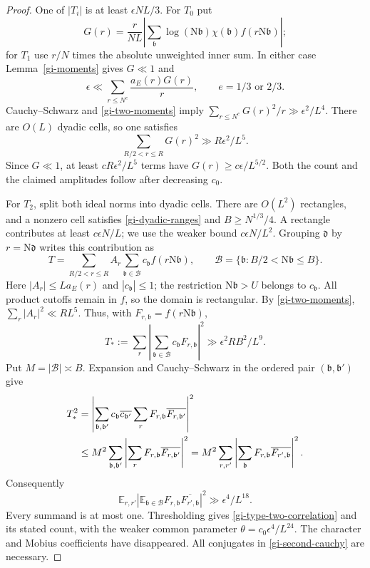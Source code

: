 \documentclass[11pt]{article}
\theoremstyle{definition}
\theoremstyle{remark}
\begin{document}
\begin{proof}
One of $|T_i|$ is at least $\epsilon NL/3$.  For $T_0$ put
\[
 G(r)=\frac{r}{NL}\left|\sum_{\mathfrak b}\log(\mathrm N\mathfrak b)
                   \chi(\mathfrak b)f(r\mathrm N\mathfrak b)\right|;
\]
for $T_1$ use $r/N$ times the absolute unweighted inner sum.  In either
case Lemma~\ref{gi-moments} gives $G\ll1$ and
\[
 \epsilon\ll\sum_{r\leq N^e}\frac{a_E(r)G(r)}r,
 \qquad e=1/3\text{ or }2/3.
\]
Cauchy--Schwarz and \eqref{gi-two-moments} imply
$\sum_{r\leq N^e}G(r)^2/r\gg\epsilon^2/L^4$.
There are $O(L)$ dyadic cells, so one satisfies
\[
 \sum_{R/2<r\leq R}G(r)^2\gg R\epsilon^2/L^5.
\]
Since $G\ll1$, at least $cR\epsilon^2/L^5$ terms have
$G(r)\geq c\epsilon/L^{5/2}$.  Both the count and the claimed amplitudes
follow after decreasing $c_0$.

For $T_2$, split both ideal norms into dyadic cells.  There are $O(L^2)$
rectangles, and a nonzero cell satisfies \eqref{gi-dyadic-ranges} and
$B\geq N^{1/3}/4$.  A rectangle contributes at least $c\epsilon N/L$;
we use the weaker bound $c\epsilon N/L^2$.  Grouping $\mathfrak d$ by
$r=\mathrm N\mathfrak d$ writes this contribution as
\[
 T=\sum_{R/2<r\leq R}A_r\sum_{\mathfrak b\in\mathcal B}c_{\mathfrak b}
                   f(r\mathrm N\mathfrak b),\qquad
 \mathcal B=\{\mathfrak b:B/2<\mathrm N\mathfrak b\leq B\}.
\]
Here $|A_r|\leq L a_E(r)$ and $|c_{\mathfrak b}|\leq1$; the restriction
$\mathrm N\mathfrak b>U$ belongs to $c_{\mathfrak b}$.  All product
cutoffs remain in $f$, so the domain is rectangular.  By
\eqref{gi-two-moments}, $\sum_r|A_r|^2\ll RL^5$.  Thus, with
$F_{r,\mathfrak b}=f(r\mathrm N\mathfrak b)$,
\begin{equation}\label{gi-first-cauchy}
 T_*:=\sum_r\left|\sum_{\mathfrak b\in\mathcal B}
                          c_{\mathfrak b}F_{r,\mathfrak b}\right|^2
          \gg \epsilon^2 RB^2/L^9.
\end{equation}
Put $M=|\mathcal B|\asymp B$.  Expansion and Cauchy--Schwarz in the
ordered pair $(\mathfrak b,\mathfrak b')$ give
\begin{align}
 T_*^2
 &=\left|\sum_{\mathfrak b,\mathfrak b'}
 c_{\mathfrak b}\overline{c_{\mathfrak b'}}
 \sum_r F_{r,\mathfrak b}\overline{F_{r,\mathfrak b'}}\right|^2\notag\\
 &\leq M^2\sum_{\mathfrak b,\mathfrak b'}
       \left|\sum_rF_{r,\mathfrak b}\overline{F_{r,\mathfrak b'}}\right|^2
 =M^2\sum_{r,r'}\left|\sum_{\mathfrak b}
                  F_{r,\mathfrak b}\overline{F_{r',\mathfrak b}}\right|^2.
 \label{gi-second-cauchy}
\end{align}
Consequently
\[
 \mathbb E_{r,r'}\left|\mathbb E_{\mathfrak b\in\mathcal B}
              F_{r,\mathfrak b}\overline{F_{r',\mathfrak b}}\right|^2
       \gg\epsilon^4/L^{18}.
\]
Every summand is at most one.  Thresholding gives
\eqref{gi-type-two-correlation} and its stated count, with the weaker
common parameter $\theta=c_0\epsilon^4/L^{24}$.  The character and Mobius
coefficients have disappeared.  All conjugates in
\eqref{gi-second-cauchy} are necessary.
\end{proof}
\end{document}
